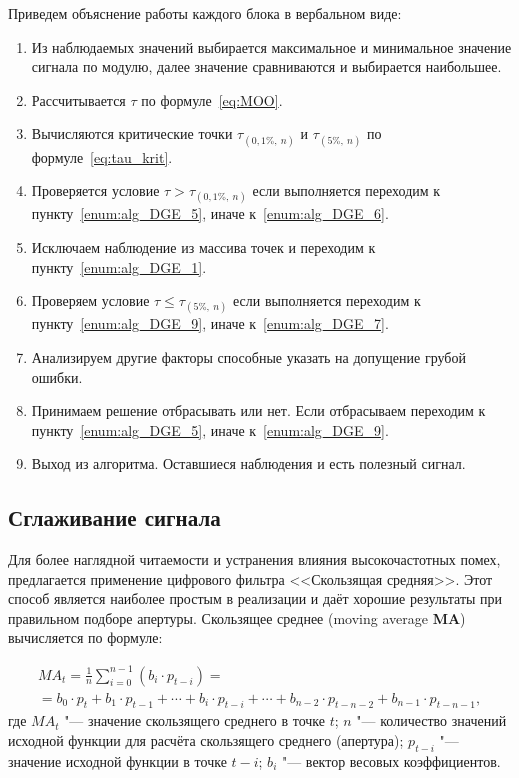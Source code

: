 	Приведем объяснение работы каждого блока в вербальном виде:
	\begin{enumerate}
		\item Из наблюдаемых значений выбирается максимальное и минимальное значение сигнала по модулю, далее значение сравниваются и выбирается наибольшее.\label{enum:alg_DGE_1}
		\item Рассчитывается $ \tau $ по формуле~\ref{eq:MOO}.
		\item Вычисляются критические точки $ \tau_{(0,1\%,\ n)} $ и $ \tau_{(5\%,\ n)} $ по формуле~\ref{eq:tau_krit}.
		\item Проверяется условие $ \tau > \tau_{(0,1\%,\ n)} $ если выполняется переходим к пункту~\ref{enum:alg_DGE_5}, иначе к~\ref{enum:alg_DGE_6}.
		\item Исключаем наблюдение из массива точек и переходим к пункту~\ref{enum:alg_DGE_1}.\label{enum:alg_DGE_5}
		\item Проверяем условие $ \tau \leqslant \tau_{(5\%,\ n)} $ если выполняется переходим к пункту~\ref{enum:alg_DGE_9}, иначе к~\ref{enum:alg_DGE_7}.\label{enum:alg_DGE_6}
		\item Анализируем другие факторы способные указать на допущение грубой ошибки.\label{enum:alg_DGE_7}
		\item Принимаем решение отбрасывать или нет. Если отбрасываем переходим к пункту~\ref{enum:alg_DGE_5}, иначе к~\ref{enum:alg_DGE_9}.\label{enum:alg_DGE_8}
		\item Выход из алгоритма. Оставшиеся наблюдения и есть полезный сигнал.\label{enum:alg_DGE_9}
	\end{enumerate}

	\subsection{Сглаживание сигнала}
	
	Для более наглядной читаемости и устранения влияния высокочастотных помех, предлагается применение цифрового фильтра <<Скользящая средняя>>. Этот способ является наиболее простым в реализации и даёт хорошие результаты при правильном подборе апертуры. Скользящее среднее (moving average \textbf{MA}) вычисляется по формуле:

	\begin{equation}
		\begin{multlined}
			MA_t=\frac{1}{n}\sum_{i=0}^{n-1}\left( b_i \cdot p_{t-i}\right) = \\
			= b_0 \cdot p_t+b_1 \cdot p_{t-1}+\cdots+b_i \cdot p_{t-i}+\cdots+b_{n-2} \cdot p_{t-n-2}+b_{n-1} \cdot p_{t-n-1},
		\end{multlined}
	\end{equation}
	где $ MA_t $ "--- значение скользящего среднего в точке $ t $; $ n $ "--- количество значений исходной функции для расчёта скользящего среднего (апертура); $ p_{t-i} $ "--- значение исходной функции в точке $ t-i $; $ b_i $ "--- вектор весовых коэффициентов.
	
